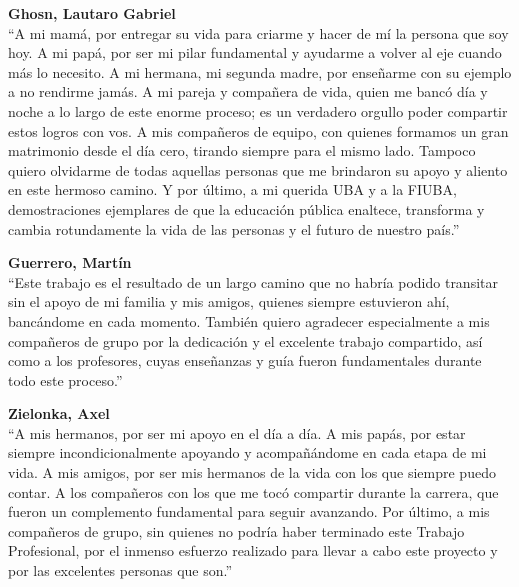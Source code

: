 \vspace{0.1cm}

\noindent \textbf{Ghosn, Lautaro Gabriel} \\
``A mi mamá, por entregar su vida para criarme y hacer de mí la persona que soy hoy. A mi papá, por ser mi pilar fundamental y ayudarme a volver al eje cuando más lo necesito. A mi hermana, mi segunda madre, por enseñarme con su ejemplo a no rendirme jamás. A mi pareja y compañera de vida, quien me bancó día y noche a lo largo de este enorme proceso; es un verdadero orgullo poder compartir estos logros con vos. A mis compañeros de equipo, con quienes formamos un gran matrimonio desde el día cero, tirando siempre para el mismo lado. Tampoco quiero olvidarme de todas aquellas personas que me brindaron su apoyo y aliento en este hermoso camino. Y por último, a mi querida UBA y a la FIUBA, demostraciones ejemplares de que la educación pública enaltece, transforma y cambia rotundamente la vida de las personas y el futuro de nuestro país.''

\vspace{0.1cm}

\noindent \textbf{Guerrero, Martín} \\
``Este trabajo es el resultado de un largo camino que no habría podido transitar sin el apoyo de mi familia y mis amigos, quienes siempre estuvieron ahí, bancándome en cada momento. También quiero agradecer especialmente a mis compañeros de grupo por la dedicación y el excelente trabajo compartido, así como a los profesores, cuyas enseñanzas y guía fueron fundamentales durante todo este proceso.''

\vspace{0.1cm}

\noindent \textbf{Zielonka, Axel} \\
``A mis hermanos, por ser mi apoyo en el día a día. A mis papás, por estar siempre incondicionalmente apoyando y acompañándome en cada etapa de mi vida. A mis amigos, por ser mis hermanos de la vida con los que siempre puedo contar. A los compañeros con los que me tocó compartir durante la carrera, que fueron un complemento fundamental para seguir avanzando. Por último, a mis compañeros de grupo, sin quienes no podría haber terminado este Trabajo Profesional, por el inmenso esfuerzo realizado para llevar a cabo este proyecto y por las excelentes personas que son.''
